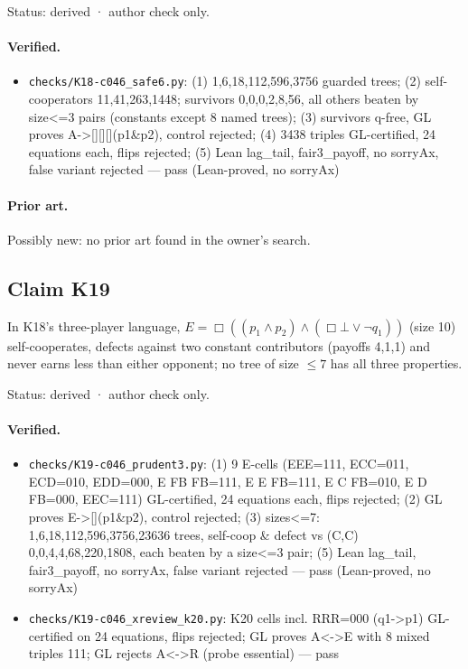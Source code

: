 \documentclass{article}
\begin{document}
Status: derived · author check only.

\paragraph{Verified.}
\begin{itemize}
\item \texttt{checks/K18-c046\_safe6.py}: (1) 1,6,18,112,596,3756 guarded trees; (2) self-cooperators 11,41,263,1448; survivors 0,0,0,2,8,56, all others beaten by size\textless{}=3 pairs (constants except 8 named trees); (3) survivors q-free, GL proves A-\textgreater{}[][][](p1\&p2), control rejected; (4) 3438 triples GL-certified, 24 equations each, flips rejected; (5) Lean lag\_tail, fair3\_payoff, no sorryAx, false variant rejected --- pass (Lean-proved, no sorryAx)
\end{itemize}

\paragraph{Prior art.} Possibly new: no prior art found in the owner's search.

\subsection*{Claim K19}

In K18's three-player language, $E=\Box((p_1\land p_2)\land(\Box\bot\lor\neg q_1))$ (size 10) self-cooperates, defects against two constant contributors (payoffs 4,1,1) and never earns less than either opponent; no tree of size $\le7$ has all three properties.

Status: derived · author check only.

\paragraph{Verified.}
\begin{itemize}
\item \texttt{checks/K19-c046\_prudent3.py}: (1) 9 E-cells (EEE=111, ECC=011, ECD=010, EDD=000, E FB FB=111, E E FB=111, E C FB=010, E D FB=000, EEC=111) GL-certified, 24 equations each, flips rejected; (2) GL proves E-\textgreater{}[](p1\&p2), control rejected; (3) sizes\textless{}=7: 1,6,18,112,596,3756,23636 trees, self-coop \& defect vs (C,C) 0,0,4,4,68,220,1808, each beaten by a size\textless{}=3 pair; (5) Lean lag\_tail, fair3\_payoff, no sorryAx, false variant rejected --- pass (Lean-proved, no sorryAx)
\item \texttt{checks/K19-c046\_xreview\_k20.py}: K20 cells incl. RRR=000 (q1-\textgreater{}p1) GL-certified on 24 equations, flips rejected; GL proves A\textless{}-\textgreater{}E with 8 mixed triples 111; GL rejects A\textless{}-\textgreater{}R (probe essential) --- pass
\end{itemize}
\end{document}
